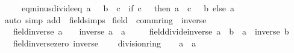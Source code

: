 \begin{isabellebody}
\ \ \ \ \ eq{\isacharunderscore}{\kern0pt}minus{\isacharunderscore}{\kern0pt}divide{\isacharunderscore}{\kern0pt}eq{\isacharcolon}{\kern0pt}\ {\isachardoublequoteopen}a\ {\isacharequal}{\kern0pt}\ {\isacharminus}{\kern0pt}\ {\isacharparenleft}{\kern0pt}b\ {\isacharslash}{\kern0pt}\ c{\isacharparenright}{\kern0pt}\ {\isasymlongleftrightarrow}\ {\isacharparenleft}{\kern0pt}if\ c\ {\isasymnoteq}\ {}\ then\ a\ {\isacharasterisk}{\kern0pt}\ c\ {\isacharequal}{\kern0pt}\ {\isacharminus}{\kern0pt}\ b\ else\ a\ {\isacharequal}{\kern0pt}\ {}{\isacharparenright}{\kern0pt}{\isachardoublequoteclose}\isanewline
%
\isadelimproof
\ \ %
\endisadelimproof
%
\isatagproof
{}\isamarkupfalse%
\ {\isacharparenleft}{\kern0pt}auto\ simp\ add{\isacharcolon}{\kern0pt}\ \ field{\isacharunderscore}{\kern0pt}simps{\isacharparenright}{\kern0pt}%
\endisatagproof
{\isafoldproof}%
%
\isadelimproof
\isanewline
%
\endisadelimproof
\isanewline
{}\isamarkupfalse%
%
\isadelimdocument
%
\endisadelimdocument
%
\isatagdocument
%
\isamarkuptrue%
%
\endisatagdocument
{\isafolddocument}%
%
\isadelimdocument
%
\endisadelimdocument
{}\isamarkupfalse%
\ field\ {\isacharequal}{\kern0pt}\ comm{\isacharunderscore}{\kern0pt}ring{\isacharunderscore}{\kern0pt}{}\ {\isacharplus}{\kern0pt}\ inverse\ {\isacharplus}{\kern0pt}\isanewline
\ \ \ field{\isacharunderscore}{\kern0pt}inverse{\isacharcolon}{\kern0pt}\ {\isachardoublequoteopen}a\ {\isasymnoteq}\ {}\ {\isasymLongrightarrow}\ inverse\ a\ {\isacharasterisk}{\kern0pt}\ a\ {\isacharequal}{\kern0pt}\ {}{\isachardoublequoteclose}\isanewline
\ \ \ field{\isacharunderscore}{\kern0pt}divide{\isacharunderscore}{\kern0pt}inverse{\isacharcolon}{\kern0pt}\ {\isachardoublequoteopen}a\ {\isacharslash}{\kern0pt}\ b\ {\isacharequal}{\kern0pt}\ a\ {\isacharasterisk}{\kern0pt}\ inverse\ b{\isachardoublequoteclose}\isanewline
\ \ \ field{\isacharunderscore}{\kern0pt}inverse{\isacharunderscore}{\kern0pt}zero{\isacharcolon}{\kern0pt}\ {\isachardoublequoteopen}inverse\ {}\ {\isacharequal}{\kern0pt}\ {}{\isachardoublequoteclose}\isanewline
{}\isanewline
\isanewline
{}\isamarkupfalse%
\ division{\isacharunderscore}{\kern0pt}ring\isanewline
%
\isadelimproof
%
\endisadelimproof
%
\isatagproof
{}\isamarkupfalse%
\isanewline
\ \ \isamarkupfalse%
\ a\ {\isacharcolon}{\kern0pt}{\isacharcolon}{\kern0pt}\ {\isacharprime}{\kern0pt}a\isanewline

\end{isabellebody}
